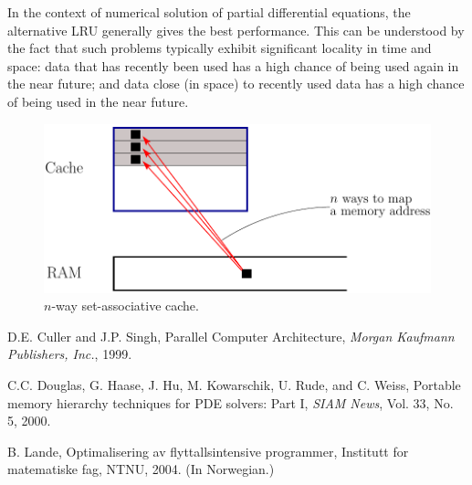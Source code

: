 \documentclass[11pt]{article}
\begin{document}
In the context of numerical solution of partial differential equations, 
the alternative LRU generally gives the best performance. 
This can be understood by the fact that such problems typically 
exhibit significant locality in time and space: data that has recently 
been used has a high chance of being used again in the near future; 
and data close (in space) to recently used data has a high chance of 
being used in the near future. 
\vspace{2cm}

\begin{figure}[htbp]
  \begin{center}
    \includegraphics[scale=0.8]{NWayCache}
  \end{center}
  \caption{$n$-way set-associative cache. 
}
\label{fig:NWayCache}
\end{figure}


\begin{thebibliography}{99}

\bibitem {} D.E. Culler and J.P. Singh, Parallel Computer Architecture, 
{\em Morgan Kaufmann Publishers, Inc.}, 1999. 

\bibitem {} C.C. Douglas, G. Haase, J. Hu, M. Kowarschik, U. Rude, 
and C. Weiss, Portable memory hierarchy techniques for PDE solvers: Part I, 
{\em SIAM News}, Vol. 33, No. 5, 2000. 

\bibitem  {} B. Lande, Optimalisering av flyttallsintensive programmer, 
Institutt for matematiske fag, NTNU, 2004. (In Norwegian.)


\end{thebibliography}
\end{document}
